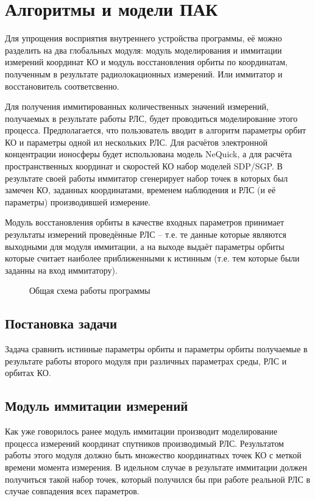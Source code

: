 \chapter{Алгоритмы и модели ПАК}

Для упрощения восприятия внутреннего устройства программы, её можно разделить на два глобальных модуля: модуль
моделирования и иммитации измерений координат КО и модуль восстановления орбиты по координатам, полученным в
результате радиолокационных измерений. Или иммитатор и восстановитель соответсвенно.

Для получения иммитированных количественных значений измерений, получаемых в результате работы 
РЛС, будет проводиться моделирование этого процесса. Предполагается, что
пользователь вводит в алгоритм параметры орбит КО и параметры одной ил нескольких РЛС. Для расчётов электронной
концентрации ионосферы будет использована модель NeQuick\cite{NeQuick}, а для расчёта пространственных координат и
скоростей КО набор моделей SDP/SGP\cite{Norad}. В результате своей работы иммитатор сгенерирует набор точек в которых 
был замечен КО, заданных координатами, временем наблюдения и РЛС (и её параметры) производившей измерение.

Модуль восстановления орбиты в качестве входных параметров принимает результаты измерений проведённые РЛС 
-- т.е. те данные которые являются выходными для модуля иммитации, а на выходе выдаёт параметры орбиты которые 
считает наиболее приближенными к истинным (т.е. тем которые были заданны на вход иммитатору).

\begin{figure}[h]
	\centering
	
	\caption{Общая схема работы программы}
\end{figure}

\section{Постановка задачи}

Задача сравнить истинные параметры орбиты и параметры орбиты получаемые в результате работы второго модуля при 
различных параметрах среды, РЛС и орбитах КО.


\section{Модуль иммитации измерений}

Как уже говорилось ранее модуль иммитации производит моделирование процесса измерений координат спутников 
производимый РЛС. Результатом работы этого модуля должно быть множество координатных точек КО с меткой времени момента 
измерения. В идельном случае в результате иммитации должен получиться такой набор точек, который получился бы при 
работе реальной РЛС в случае совпадения всех параметров.

